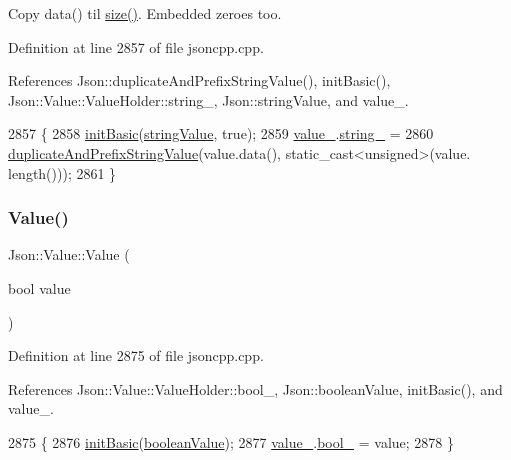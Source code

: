 Copy data() til \hyperlink{class_json_1_1_value_a0ec2808e1d7efa4e9fad938d6667be44}{size()}. Embedded zeroes too. 



Definition at line 2857 of file jsoncpp.\+cpp.



References Json\+::duplicate\+And\+Prefix\+String\+Value(), init\+Basic(), Json\+::\+Value\+::\+Value\+Holder\+::string\+\_\+, Json\+::string\+Value, and value\+\_\+.


\begin{DoxyCode}
2857                                         \{
2858   \hyperlink{class_json_1_1_value_a32b86b71564157f40f880f5736be822a}{initBasic}(\hyperlink{namespace_json_a7d654b75c16a57007925868e38212b4ea804ef857affea2d415843c73f261c258}{stringValue}, \textcolor{keyword}{true});
2859   \hyperlink{class_json_1_1_value_aef578244546212705b9f81eb84d7e151}{value\_}.\hyperlink{union_json_1_1_value_1_1_value_holder_a70ac2b153bc405527baa3850d2ddc3cb}{string\_} =
2860       \hyperlink{namespace_json_a9795a09a0141d1f12d307c4386aeaee6}{duplicateAndPrefixStringValue}(value.data(), \textcolor{keyword}{static\_cast<}\textcolor{keywordtype}{unsigned}\textcolor{keyword}{>}(value.
      length()));
2861 \}
\end{DoxyCode}
\mbox{\label{class_json_1_1_value_a350a31ea4a30d384994b0bc010b17495}} 
\subsubsection{\texorpdfstring{Value()}{Value()}\hspace{0.1cm}{\footnotesize\ttfamily [11/12]}}
{\footnotesize\ttfamily Json\+::\+Value\+::\+Value (\begin{DoxyParamCaption}\item[{bool}]{value }\end{DoxyParamCaption})}



Definition at line 2875 of file jsoncpp.\+cpp.



References Json\+::\+Value\+::\+Value\+Holder\+::bool\+\_\+, Json\+::boolean\+Value, init\+Basic(), and value\+\_\+.


\begin{DoxyCode}
2875                        \{
2876   \hyperlink{class_json_1_1_value_a32b86b71564157f40f880f5736be822a}{initBasic}(\hyperlink{namespace_json_a7d654b75c16a57007925868e38212b4ea14c30dbf4da86f7b809be299f671f7fd}{booleanValue});
2877   \hyperlink{class_json_1_1_value_aef578244546212705b9f81eb84d7e151}{value\_}.\hyperlink{union_json_1_1_value_1_1_value_holder_a92edab1861dadbfefd8be5fd4285eefe}{bool\_} = value;
2878 \}
\end{DoxyCode}
\mbox{\label{class_json_1_1_value_a436dfd3670f95fd665f680eba5cebcf0}} 
